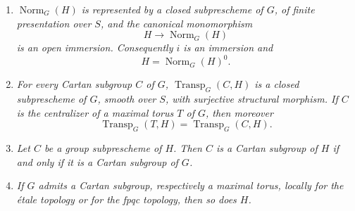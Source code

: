 \begin{enumerate}
\item[\emph{(a)}] \emph{\(\operatorname{Norm}_G(H)\) is represented
by a closed subprescheme of \(G\), of finite presentation over
\(S\), and the canonical monomorphism}
\[
  H\longrightarrow\operatorname{Norm}_G(H)
\]
\emph{is an open immersion. Consequently \(i\) is an immersion and}
\[
  H=\operatorname{Norm}_G(H)^0.
\]

\item[\emph{(b)}] \emph{For every Cartan subgroup \(C\) of \(G\),
\(\operatorname{Transp}_G(C,H)\) is a closed subprescheme of \(G\),
smooth over \(S\), with surjective structural morphism. If \(C\) is
the centralizer of a maximal torus \(T\) of \(G\), then moreover}
\[
  \operatorname{Transp}_G(T,H)
  =
  \operatorname{Transp}_G(C,H).
\]

\item[\emph{(c)}] \emph{Let \(C\) be a group subprescheme of \(H\).
Then \(C\) is a Cartan subgroup of \(H\) if and only if it is a
Cartan subgroup of \(G\).}

\item[\emph{(d)}] \emph{If \(G\) admits a Cartan subgroup,
respectively a maximal torus, locally for the étale topology or for
the fpqc topology, then so does \(H\).}
\end{enumerate}

